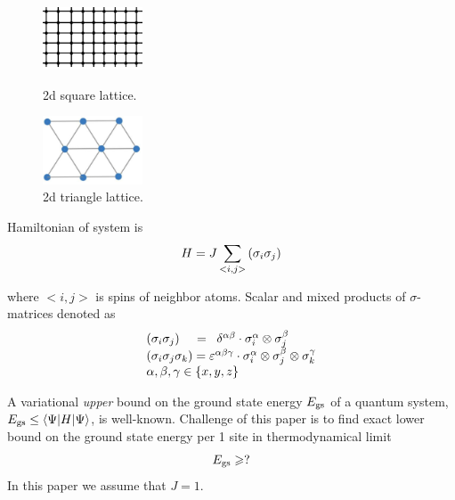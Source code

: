 \documentclass[a4paper]{jpconf}
\renewcommand\[{\begin{equation}}
\renewcommand\]{\end{equation}}
\begin{document}
\begin{figure}[h]
	\begin{minipage}{7pc}
		\includegraphics[width=7pc]{sqlattice.png}
	\end{minipage}\hspace{2pc}%
	\begin{minipage}{7pc}
		\caption{\label{label} 2d square lattice.}
	\end{minipage}\hspace{2pc}%
	\begin{minipage}{7pc}
		\includegraphics[width=7pc]{triangle-lattice.png}
	\end{minipage}\hspace{2pc}%
	\begin{minipage}{7pc}
		\caption{\label{label} 2d triangle lattice.}
	\end{minipage} 
\end{figure}

Hamiltonian of system is
\[H = J\sum\limits_{ < i,j > } {({{\bf{\sigma }}_i}{{\bf{\sigma }}_j})} \label{ham}\]

where $<i,j>$ is spins of neighbor atoms. 
Scalar and mixed products of $\sigma$-matrices denoted as
\[\begin{array}{l}
({{\bf{\sigma }}_i}{{\bf{\sigma }}_j})\;\;\;\; = \;\;{\delta ^{\alpha \beta }} \cdot \sigma _i^\alpha  \otimes \sigma _j^\beta \\
({{\bf{\sigma }}_i}{{\bf{\sigma }}_j}{{\bf{\sigma }}_k}) = {\varepsilon ^{\alpha \beta \gamma }} \cdot \sigma _i^\alpha  \otimes \sigma _j^\beta  \otimes \sigma _k^\gamma \\
\alpha ,\beta ,\gamma  \in \{ x,y,z\} 
\end{array}
\label{products}
\]

A variational {\it upper} bound on the ground state energy $E_{\rm gs}$ of a quantum system, $E_{\rm gs} \leq \langle \Psi|H| \Psi \rangle$, is well-known.
Challenge of this paper is to find exact lower bound on the ground state energy per 1 site in thermodynamical limit
\[E_{\rm gs} \geqslant ?\]
In this paper we assume that $J=1$.
\end{document}
